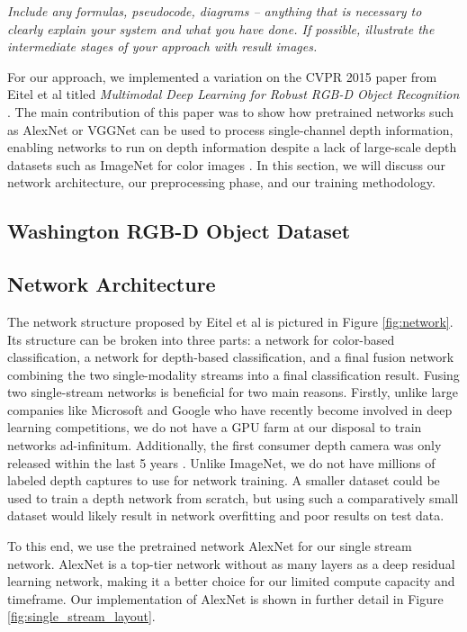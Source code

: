 
\textit{Include any formulas, pseudocode, diagrams -- anything that is necessary to clearly explain your system and what you have done. If possible, illustrate the intermediate stages of your approach with result images.}

For our approach, we implemented a variation on the CVPR 2015 paper from Eitel et al titled \textit{Multimodal Deep Learning for Robust RGB-D Object Recognition} \cite{Eitel2015}. The main contribution of this paper was to show how pretrained networks such as AlexNet or VGGNet can be used to process single-channel depth information, enabling networks to run on depth information despite a lack of large-scale depth datasets such as ImageNet for color images \cite{ImageNet2015}. In this section, we will discuss our network architecture, our preprocessing phase, and our training methodology.

\subsection{Washington RGB-D Object Dataset}

\subsection{Network Architecture}
The network structure proposed by Eitel et al \cite{Eitel2015} is pictured in Figure \ref{fig:network}. Its structure can be broken into three parts: a network for color-based classification, a network for depth-based classification, and a final fusion network combining the two single-modality streams into a final classification result. Fusing two single-stream networks is beneficial for two main reasons. Firstly, unlike large companies like Microsoft and Google who have recently become involved in deep learning competitions, we do not have a GPU farm at our disposal to train networks ad-infinitum. Additionally, the first consumer depth camera was only released within the last 5 years \cite{Alex2009_kinect}. Unlike ImageNet, we do not have millions of labeled depth captures to use for network training. A smaller dataset could be used to train a depth network from scratch, but using such a comparatively small dataset would likely result in network overfitting and poor results on test data.

To this end, we use the pretrained network AlexNet for our single stream network. AlexNet is a top-tier network without as many layers as a deep residual learning network, making it a better choice for our limited compute capacity and timeframe. Our implementation of AlexNet is shown in further detail in Figure \ref{fig:single_stream_layout}. 

